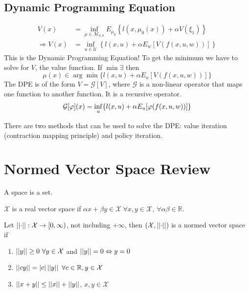 \subsection{Dynamic Programming Equation}
\begin{align}
V(x) &= \inf_{\mu\in\mathcal{M}_{0,0}} E_{\mu_0} \left\lbrace l(x,\mu_0(x)) + \alpha V(\xi_1) \right\rbrace \nonumber \\
\Rightarrow V(x) &= \inf_{u\in\mathcal{U}} \left\lbrace l(x,u) + \alpha E_w[V(f(x,u,w))] \right\rbrace
\end{align}
This is the Dynamic Programming Equation! To get the minimum we have to solve for $V$, the value function. If $\min\exists$ then
$$\mu(x)\in\arg\min\{l(x,u)+\alpha E_u[V(f(x,u,w))]\}$$
The DPE is of the form $V=\mathcal{G}[V]$, where $\mathcal{G}$ is a non-linear operator that maps one function to another function. It is a recursive operator.
$$\mathcal{G}[\varphi](x) = \inf_u\{l(x,u)+\alpha E_u[\varphi(f(x,u,w))]\}$$

There are two methods that can be used to solve the DPE: value iteration (contraction mapping principle) and policy iteration.

\section{Normed Vector Space Review}
\label{sec:normedvectorspace}
\begin{definition}
A space is a set.
\end{definition}

\begin{definition}
$\mathcal{X}$ is a real vector space if $\alpha x+\beta y\in\mathcal{X} ~\forall x,y\in\mathcal{X}, ~\forall \alpha\beta\in\mathbb{R}$.
\end{definition}

\begin{definition}
Let $\left|\left|\cdot\right|\right|: \mathcal{X}\to[0,\infty)$, not including $+\infty$, then $(\mathcal{X},\left|\left|\cdot\right|\right|)$ is a normed vector space if
\begin{enumerate}
\item $\left|\left|y\right|\right|\geq0 ~\forall y\in\mathcal{X}$ and $\left|\left|y\right|\right|=0\Leftrightarrow y=0$
\item $||cy|| = |c|\left|\left|y\right|\right| ~\forall c\in\mathbb{R}, y\in\mathcal{X}$
\item $\left|\left|x+y\right|\right|\leq ||x|| + ||y||$, $x,y\in\mathcal{X}$
\end{enumerate}
\end{definition}

